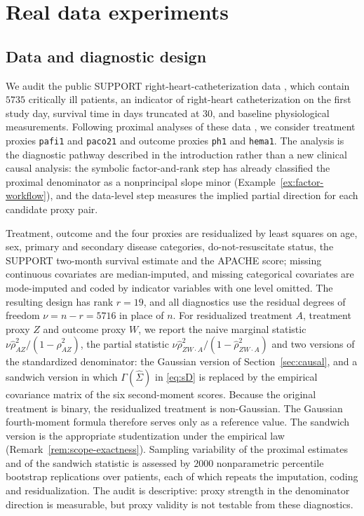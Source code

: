 \documentclass[12pt,a4paper]{article}
\theoremstyle{plain}
\theoremstyle{definition}
\newcommand{\Sighat}{\hat{\Sigma}}
\begin{document}
\section{Real data experiments}
\label{sec:realdata}

\subsection{Data and diagnostic design}

We audit the public SUPPORT right-heart-catheterization data \citep{connors1996}, which contain $5735$ critically ill patients, an indicator of right-heart catheterization on the first study day, survival time in days truncated at $30$, and baseline physiological measurements.
Following proximal analyses of these data \citep{liu2025,tchetgen2024}, we consider treatment proxies \texttt{pafi1} and \texttt{paco21} and outcome proxies \texttt{ph1} and \texttt{hema1}.
The analysis is the diagnostic pathway described in the introduction rather than a new clinical causal analysis:
the symbolic factor-and-rank step has already classified the proximal denominator as a nonprincipal slope minor (Example~\ref{ex:factor-workflow}), and the data-level step measures the implied partial direction for each candidate proxy pair.

Treatment, outcome and the four proxies are residualized by least squares on age, sex, primary and secondary disease categories, do-not-resuscitate status, the SUPPORT two-month survival estimate and the APACHE score;
missing continuous covariates are median-imputed, and missing categorical covariates are mode-imputed and coded by indicator variables with one level omitted.
The resulting design has rank $r=19$, and all diagnostics use the residual degrees of freedom $\nu=n-r=5716$ in place of $n$.
For residualized treatment $A$, treatment proxy $Z$ and outcome proxy $W$, we report the naive marginal statistic $\nu\hat{\rho}_{AZ}^2/(1-\hat{\rho}_{AZ}^2)$, the partial statistic $\nu\hat{\rho}_{ZW\mathbin{\cdot} A}^2/(1-\hat{\rho}_{ZW\mathbin{\cdot} A}^2)$ and two versions of the standardized denominator:
the Gaussian version of Section~\ref{sec:causal}, and a sandwich version in which $\Gamma(\Sighat)$ in \eqref{eq:sD} is replaced by the empirical covariance matrix of the six second-moment scores.
Because the original treatment is binary, the residualized treatment is non-Gaussian.
The Gaussian fourth-moment formula therefore serves only as a reference value. 
The sandwich version is the appropriate studentization under the empirical law (Remark~\ref{rem:scope-exactness}).
Sampling variability of the proximal estimates and of the sandwich statistic is assessed by $2000$ nonparametric percentile bootstrap replications over patients, each of which repeats the imputation, coding and residualization.
The audit is descriptive:
proxy strength in the denominator direction is measurable, but proxy validity is not testable from these diagnostics.
\end{document}
